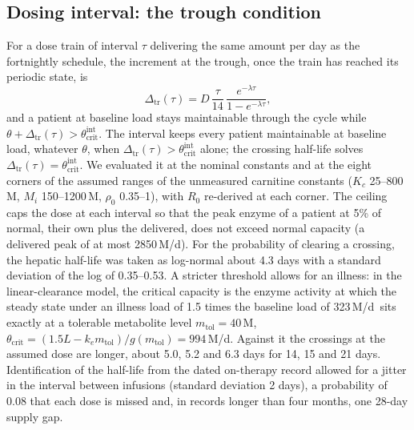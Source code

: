 \documentclass[11pt]{article}
\newcommand{\um}{\,\textmu M/d}
\newcommand{\thci}{\theta_{\mathrm{crit}}^{\mathrm{int}}}
\newcommand{\dtr}{\Delta_{\mathrm{tr}}}
\begin{document}
\subsection*{Dosing interval: the trough condition}\label{sec:trough}
For a dose train of interval $\tau$ delivering the same amount per day as the fortnightly
schedule, the increment at the trough, once the train has reached its periodic state, is
\begin{equation}
\label{eq:trough}
\dtr(\tau)=D\,\frac{\tau}{14}\,\frac{e^{-\lambda\tau}}{1-e^{-\lambda\tau}},
\end{equation}
and a patient at baseline load stays maintainable through the cycle while
$\theta+\dtr(\tau)>\thci$. The interval keeps every patient maintainable at baseline load,
whatever $\theta$, when $\dtr(\tau)>\thci$ alone; the crossing half-life solves
$\dtr(\tau)=\thci$. We evaluated it at the nominal constants and at the eight corners of the
assumed ranges of the unmeasured carnitine constants ($K_c$ 25--800\,\textmu M, $M_i$ 150--1200\,\textmu M, $\rho_0$
0.35--1), with $R_0$ re-derived at each corner. The ceiling caps the dose at each interval so
that the peak enzyme of a patient at 5\% of normal, their own plus the delivered, does not exceed
normal capacity (a delivered peak of at most 2850\um). For the probability of clearing a
crossing, the hepatic half-life was taken as log-normal about 4.3 days with a standard deviation
of the log of 0.35--0.53. A stricter threshold allows for an illness: in the linear-clearance model, the critical capacity is
the enzyme activity at which the steady state under an illness load of 1.5 times the baseline load
of 323\um\ sits exactly at a tolerable metabolite level $m_{\mathrm{tol}}=40$\,\textmu M,
$\theta_{\mathrm{crit}}=(1.5L-k_e m_{\mathrm{tol}})/g(m_{\mathrm{tol}})=994$\um. Against it the
crossings at the assumed dose are longer, about 5.0, 5.2 and 6.3 days for 14, 15 and 21 days.
Identification of the half-life from the dated on-therapy record allowed for a jitter in the
interval between infusions (standard deviation 2 days), a probability of 0.08 that each dose is
missed and, in records longer than four months, one 28-day supply gap.
\end{document}
